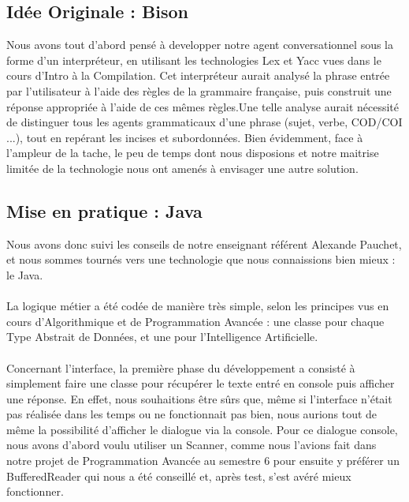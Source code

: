 \subsection{Idée Originale : Bison} Nous avons tout d'abord pensé à developper notre agent conversationnel sous la forme d'un interpréteur, en utilisant les technologies Lex et Yacc vues dans le cours d'Intro à la Compilation. Cet interpréteur aurait analysé la phrase entrée par l'utilisateur à l'aide des règles de la grammaire française, puis construit une réponse appropriée à l'aide de ces mêmes règles.Une telle analyse aurait nécessité de distinguer tous les agents grammaticaux d'une phrase (sujet, verbe, COD/COI ...), tout en repérant les incises et subordonnées. Bien évidemment, face à  l'ampleur de la tache, le peu de temps dont nous disposions et notre maitrise limitée de la technologie nous ont amenés à envisager une autre solution.

\subsection{Mise en pratique : Java}
Nous avons donc suivi les conseils de notre enseignant référent Alexande Pauchet, et nous sommes tournés vers une technologie que nous connaissions bien mieux : le Java.
\paragraph{}La logique métier a été codée de manière très simple, selon les principes vus en cours d'Algorithmique et de Programmation Avancée : une classe pour chaque Type Abstrait de Données, et une pour l'Intelligence Artificielle.
\paragraph{}Concernant l'interface, la première phase du développement a consisté à simplement faire une classe pour récupérer le texte entré en console puis afficher une réponse. En effet, nous souhaitions être sûrs que, même si l'interface n'était pas réalisée dans les temps ou ne fonctionnait pas bien, nous aurions tout de même la possibilité d'afficher le dialogue via la console. 
Pour ce dialogue console, nous avons d'abord voulu utiliser un Scanner, comme nous l'avions fait dans notre projet de Programmation Avancée au semestre 6 pour ensuite y préférer un BufferedReader qui nous a été conseillé et, après test, s'est avéré mieux fonctionner.

